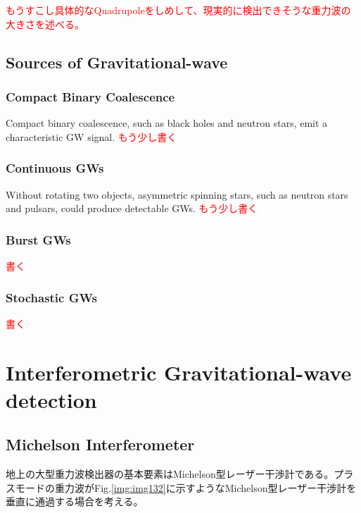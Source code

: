 \textcolor{red}{もうすこし具体的なQuadrupoleをしめして、現実的に検出できそうな重力波の大きさを述べる。}

\subsection{Sources of Gravitational-wave}
\subsubsection{Compact Binary Coalescence}
Compact binary coalescence, such as black holes and neutron stars, emit a characteristic GW signal. \textcolor{red}{もう少し書く}

\subsubsection{Continuous GWs}
Without rotating two objects, asymmetric spinning stars, such as neutron stars and pulsars, could produce detectable GWs. \textcolor{red}{もう少し書く}
\subsubsection{Burst GWs}
\textcolor{red}{書く}

\subsubsection{Stochastic GWs}
\textcolor{red}{書く}
\cite{starobinskii1979spectrum,damour2005gravitational,Christensen_2018}

\section{Interferometric Gravitational-wave detection} \label{sec:12}

\subsection{Michelson Interferometer} \label{sec:121}
地上の大型重力波検出器の基本要素はMichelson型レーザー干渉計である\cite{weiss1972electronically}。プラスモードの重力波がFig.\ref{img:img132}に示すようなMichelson型レーザー干渉計を垂直に通過する場合を考える。

